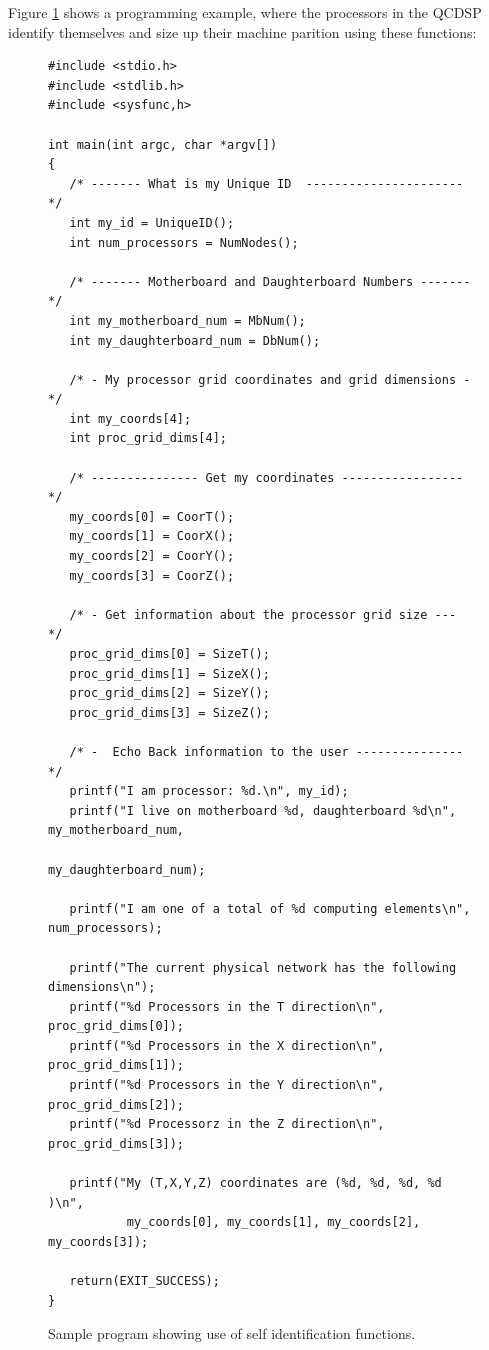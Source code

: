 Figure \ref{f:whoamiCode} shows a programming example, where the processors
in the QCDSP identify themselves and size up their machine parition using
these functions:
\begin{figure}[h]
\tiny
\begin{verbatim}
#include <stdio.h>
#include <stdlib.h>
#include <sysfunc,h>

int main(int argc, char *argv[])
{
   /* ------- What is my Unique ID  ---------------------- */
   int my_id = UniqueID();
   int num_processors = NumNodes();

   /* ------- Motherboard and Daughterboard Numbers -------*/
   int my_motherboard_num = MbNum();
   int my_daughterboard_num = DbNum();

   /* - My processor grid coordinates and grid dimensions -*/
   int my_coords[4];
   int proc_grid_dims[4];

   /* --------------- Get my coordinates ----------------- */
   my_coords[0] = CoorT();
   my_coords[1] = CoorX();
   my_coords[2] = CoorY();
   my_coords[3] = CoorZ();

   /* - Get information about the processor grid size ---  */
   proc_grid_dims[0] = SizeT();
   proc_grid_dims[1] = SizeX();
   proc_grid_dims[2] = SizeY();
   proc_grid_dims[3] = SizeZ();

   /* -  Echo Back information to the user --------------- */
   printf("I am processor: %d.\n", my_id);
   printf("I live on motherboard %d, daughterboard %d\n",  my_motherboard_num,
                                                             my_daughterboard_num);

   printf("I am one of a total of %d computing elements\n", num_processors);
  
   printf("The current physical network has the following dimensions\n");
   printf("%d Processors in the T direction\n", proc_grid_dims[0]);
   printf("%d Processors in the X direction\n", proc_grid_dims[1]);
   printf("%d Processors in the Y direction\n", proc_grid_dims[2]);
   printf("%d Processorz in the Z direction\n", proc_grid_dims[3]);
  
   printf("My (T,X,Y,Z) coordinates are (%d, %d, %d, %d )\n", 
           my_coords[0], my_coords[1], my_coords[2], my_coords[3]);

   return(EXIT_SUCCESS);
}
\end{verbatim}
\caption{Sample program showing use of self identification functions.}
\label{f:whoamiCode}
\end{figure}   

